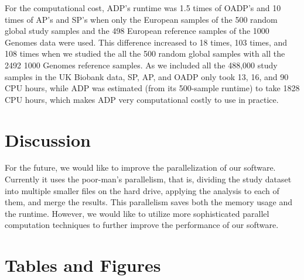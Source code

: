 \documentclass{article}
\begin{document}
For the computational cost,
ADP's runtime was 1.5 times of OADP's and 10 times of AP's and SP's
when only the European samples
of the 500 random global study samples
and the 498 European reference samples of the 1000 Genomes data
were used.
This difference increased to 18 times, 103 times, and 108 times
when we studied the all the 500 random global samples
with all the 2492 1000 Genomes reference samples.
As we included all the 488,000 study samples in the UK Biobank data,
SP, AP, and OADP only took 13, 16, and 90 CPU hours,
while ADP was estimated (from its 500-sample runtime)
to take 1828 CPU hours,
which makes ADP very computational costly to use in practice.

\section{Discussion}

For the future, we would like
to improve the parallelization of our software.
Currently it uses the poor-man’s parallelism,
that is,
dividing the study dataset into multiple smaller files on the hard drive,
applying the analysis to each of them,
and merge the results.
This parallelism saves both the memory usage and the runtime.
However, we would like to utilize
more sophisticated parallel computation techniques
to further improve the performance of our software.

\newpage

\appendix



\newpage
\section{Tables and Figures}
\end{document}

